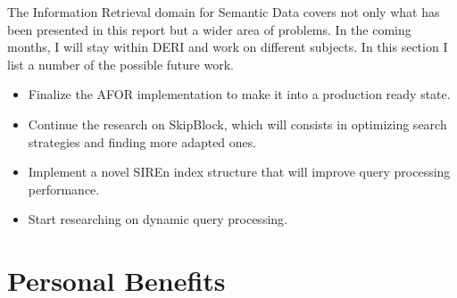 The Information Retrieval domain for Semantic Data covers not only what has
been presented in this report but a wider area of problems. In the coming
months, I will stay within DERI and work on different subjects. In this section
I list a number of the possible future work.
\begin{itemize}
  \item Finalize the AFOR implementation to make it into a production ready
  state.
  \item Continue the research on SkipBlock, which will consists in optimizing
  search strategies and finding more adapted ones.
  \item Implement a novel SIREn index structure that will improve query
  processing performance.
  \item Start researching on dynamic query processing.
\end{itemize}

\section{Personal Benefits}

